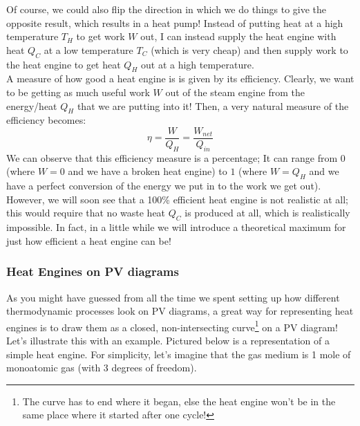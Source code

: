 Of course, we could also flip the direction in which we do things to give the opposite result, which results in a heat pump! Instead of putting heat at a high temperature $T_H$ to get work $W$ out, I can instead supply the heat engine with heat $Q_C$ at a low temperature $T_C$ (which is very cheap) and then supply work to the heat engine to get heat $Q_H$ out at a high temperature.  \\
A measure of how good a heat engine is is given by its efficiency. Clearly, we want to be getting as much useful work $W$ out of the steam engine from the energy/heat $Q_H$ that we are putting into it! Then, a very natural measure of the efficiency becomes:
\begin{equation}
    \eta = \frac{W}{Q_H} = \frac{W_{net}}{Q_{in}}
\end{equation}
We can observe that this efficiency measure is a percentage; It can range from $0$ (where $W=0$ and we have a broken heat engine) to $1$ (where $W=Q_H$ and we have a perfect conversion of the energy we put in to the work we get out). However, we will soon see that a 100\% efficient heat engine is not realistic at all; this would require that no waste heat $Q_C$ is produced at all, which is realistically impossible. In fact, in a little while we will introduce a theoretical maximum for just how efficient a heat engine can be!
\subsubsection{Heat Engines on PV diagrams}
As you might have guessed from all the time we spent setting up how different thermodynamic processes look on PV diagrams, a great way for representing heat engines is to draw them as a closed, non-intersecting curve\footnote{The curve has to end where it began, else the heat engine won't be in the same place where it started after one cycle!} on a PV diagram! Let's illustrate this with an example. Pictured below is a representation of a simple heat engine. For simplicity, let's imagine that the gas medium is 1 mole of monoatomic gas (with 3 degrees of freedom). 

